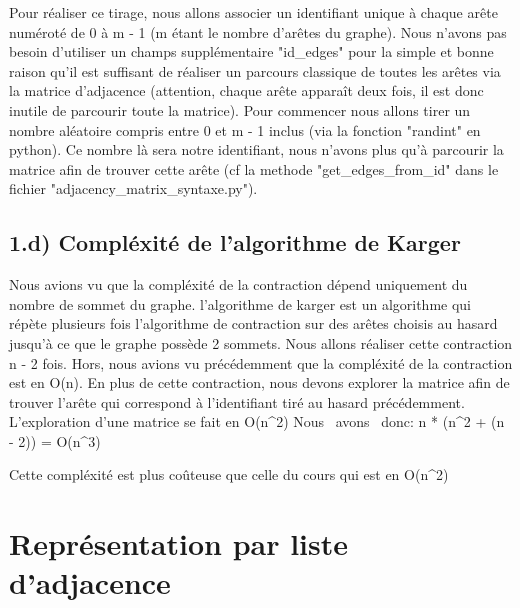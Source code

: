 Pour réaliser ce tirage, nous allons associer un identifiant unique à chaque arête numéroté de 0 à m - 1 (m étant le nombre d'arêtes du graphe). Nous n'avons pas besoin d'utiliser un champs supplémentaire "id\_edges" pour la simple et bonne raison qu'il est suffisant de réaliser un parcours classique de toutes les arêtes via la matrice d'adjacence (attention, chaque arête apparaît deux fois, il est donc inutile de parcourir toute la matrice). \newline \newline
Pour commencer nous allons tirer un nombre aléatoire compris entre 0 et m - 1 inclus (via la fonction "randint" en python). Ce nombre là sera notre identifiant, nous n'avons plus qu'à parcourir la matrice afin de trouver cette arête (cf la methode "get\_edges\_from\_id" dans le fichier "adjacency\_matrix\_syntaxe.py").

\newline \newline 


\subsection{1.d) Compléxité de l'algorithme de Karger}

Nous avions vu que la compléxité de la contraction dépend uniquement du nombre de sommet du graphe. l'algorithme de karger est un algorithme qui répète plusieurs fois l'algorithme de contraction sur des arêtes choisis au hasard jusqu'à ce que le graphe possède 2 sommets. Nous allons réaliser cette contraction n - 2 fois. Hors, nous avions vu précédemment que la compléxité de la contraction est en O(n). En plus de cette contraction, nous devons explorer la matrice afin de trouver l'arête qui correspond à l'identifiant tiré au hasard précédemment. L'exploration d'une matrice se fait en O(n^2) \newline
Nous \ avons \  donc: n * (n^2 + (n - 2)) = O(n^3) \newline \newline


Cette compléxité est plus coûteuse que celle du cours qui est en O(n^2)

\newline \newline 

\section{Représentation par liste d'adjacence}


